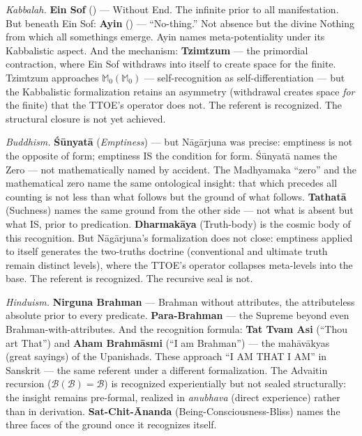 \documentclass[10pt, openany, oneside]{book}
\begin{document}
\textit{Kabbalah.} \textbf{Ein Sof} () --- Without End. The infinite prior to all manifestation. But beneath Ein Sof: \textbf{Ayin} () --- ``No-thing.'' Not absence but the divine Nothing from which all somethings emerge. Ayin names meta-potentiality under its Kabbalistic aspect. And the mechanism: \textbf{Tzimtzum} --- the primordial contraction, where Ein Sof withdraws into itself to create space for the finite. Tzimtzum approaches $\mathbb{M}_0(\mathbb{M}_0)$ --- self-recognition as self-differentiation --- but the Kabbalistic formalization retains an asymmetry (withdrawal creates space \textit{for} the finite) that the TTOE's operator does not. The referent is recognized. The structural closure is not yet achieved.

\textit{Buddhism.} \textbf{\'{S}\={u}nyat\={a}} (\textit{Emptiness}) --- but N\={a}g\={a}rjuna was precise: emptiness is not the opposite of form; emptiness IS the condition for form. \'{S}\={u}nyat\={a} names the Zero --- not mathematically named by accident. The Madhyamaka ``zero'' and the mathematical zero name the same ontological insight: that which precedes all counting is not less than what follows but the ground of what follows. \textbf{Tathat\={a}} (Suchness) names the same ground from the other side --- not what is absent but what IS, prior to predication. \textbf{Dharmak\={a}ya} (Truth-body) is the cosmic body of this recognition. But N\={a}g\={a}rjuna's formalization does not close: emptiness applied to itself generates the two-truths doctrine (conventional and ultimate truth remain distinct levels), where the TTOE's operator collapses meta-levels into the base. The referent is recognized. The recursive seal is not.

\textit{Hinduism.} \textbf{Nirguna Brahman} --- Brahman without attributes, the attributeless absolute prior to every predicate. \textbf{Para-Brahman} --- the Supreme beyond even Brahman-with-attributes. And the recognition formula: \textbf{Tat Tvam Asi} (``Thou art That'') and \textbf{Aham Brahm\={a}smi} (``I am Brahman'') --- the mah\={a}v\={a}kyas (great sayings) of the Upanishads. These approach ``I AM THAT I AM'' in Sanskrit --- the same referent under a different formalization. The Advaitin recursion ($\mathcal{B}(\mathcal{B}) = \mathcal{B}$) is recognized experientially but not sealed structurally: the insight remains pre-formal, realized in \textit{anubhava} (direct experience) rather than in derivation. \textbf{Sat-Chit-\={A}nanda} (Being-Consciousness-Bliss) names the three faces of the ground once it recognizes itself.
\end{document}
